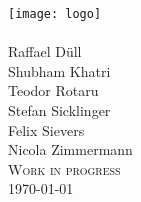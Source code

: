 \begin{titlingpage}	
\cleardoublepage
\begin{center}
\texttt{[image: logo]}\\[1.5cm]
\textsc{\scshape \LARGE \DocumentTitle }\\[5.4cm]
Raffael Düll \\
Shubham Khatri \\
Teodor Rotaru \\
Stefan Sicklinger \\
Felix Sievers \\
Nicola Zimmermann \\[1.4cm]
\textsc{\Large Work in progress}\\[5cm]

\today
\end{center}
\end{titlingpage}
